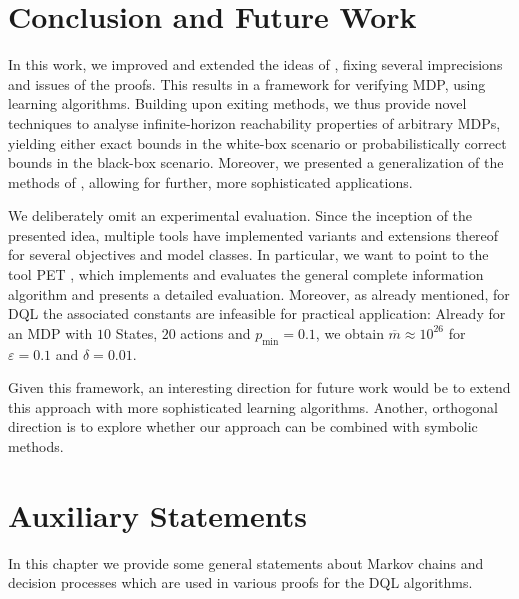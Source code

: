 \documentclass{theoretics}
\newcommand{\delay}{{\overline{m}}}
\begin{document}
 	\section{Conclusion and Future Work} \label{sec:conclusion}

In this work, we improved and extended the ideas of \cite{DBLP:conf/atva/BrazdilCCFKKPU14}, fixing several imprecisions and issues of the proofs.
This results in a framework for verifying MDP, using learning algorithms.
Building upon exiting methods, we thus provide novel techniques to analyse infinite-horizon reachability properties of arbitrary MDPs, yielding either exact bounds in the white-box scenario or probabilistically correct bounds in the black-box scenario.
Moreover, we presented a generalization of the methods of \cite{DBLP:conf/atva/BrazdilCCFKKPU14}, allowing for further, more sophisticated applications.

We deliberately omit an experimental evaluation.
Since the inception of the presented idea, multiple tools have implemented variants and extensions thereof for several objectives and model classes.
In particular, we want to point to the tool PET \cite{DBLP:conf/atva/Meggendorfer22,DBLP:conf/cav/MeggendorferW24}, which implements and evaluates the general complete information algorithm and presents a detailed evaluation.
Moreover, as already mentioned, for DQL the associated constants are infeasible for practical application:
Already for an MDP with $10$ States, $20$ actions and $p_{\min} = 0.1$, we obtain $\delay \approx 10^{26}$ for $\varepsilon = 0.1$ and $\delta = 0.01$.

Given this framework, an interesting direction for future work would be to extend this approach with more sophisticated learning algorithms.
Another, orthogonal direction is to explore whether our approach can be combined with symbolic methods.

	\printbibliography
	\appendix
	\section{Auxiliary Statements} \label{sec:appendix:auxiliary}

In this chapter we provide some general statements about Markov chains and decision processes which are used in various proofs for the DQL algorithms.
\end{document}
